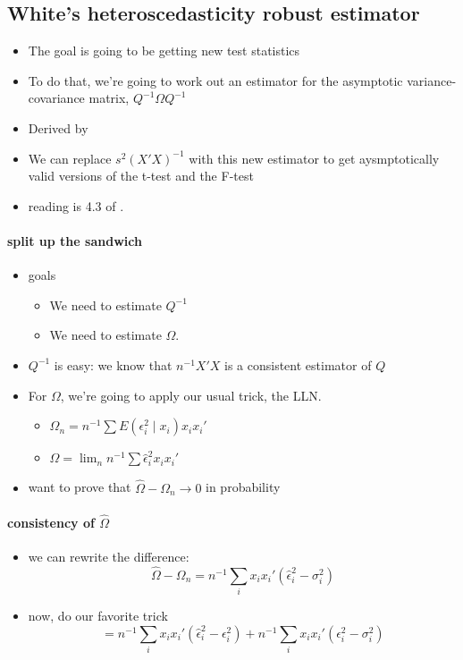 \subsection{White's heteroscedasticity robust estimator}
\begin{itemize}
\item The goal is going to be getting new test statistics
\item To do that, we're going to work out an estimator for the
       asymptotic variance-covariance matrix, $Q^{-1} \Omega Q^{-1}$
\item Derived by \citet{Whi_1980}
\item We can replace $s^2(X'X)^{-1}$ with this new estimator to get
       aysmptotically valid versions of the t-test and the F-test
\item reading is 4.3 of \citet{KlZ_2008}.
\end{itemize}

\paragraph{split up the sandwich}
\begin{itemize}
\item goals
\begin{itemize}
\item We need to estimate $Q^{-1}$
\item We need to estimate $\Omega$.
\end{itemize}
\item $Q^{-1}$ is easy: we know that $n^{-1} X'X$ is a consistent
        estimator of $Q$
\item For $\Omega$, we're going to apply our usual trick, the LLN.
\begin{itemize}
\item $\Omega_n = n^{-1} \sum E(\epsilon_i^2 \mid x_i) x_i x_i'$
\item $\hat\Omega = \lim_n n^{-1} \sum \hat\epsilon_i^2 x_i x_i'$
\end{itemize}
\item want to prove that $\hat\Omega - \Omega_n \to 0$ in probability
\end{itemize}

\paragraph{consistency of $\hat\Omega$}
\begin{itemize}
\item we can rewrite the difference:
        \[\hat\Omega - \Omega_n = n^{-1} \sum_i x_i x_i'
        (\hat\epsilon_i^2 - \sigma_i^2)\]
\item now, do our favorite trick
        \[= n^{-1} \sum_i x_i x_i'(\hat\epsilon_i^2 - \epsilon_i^2) + 
        n^{-1} \sum_i x_i x_i'(\epsilon_i^2 - \sigma_i^2)\]
\end{itemize}

